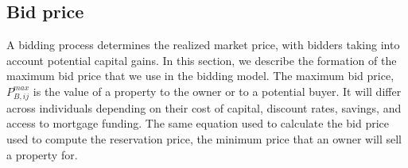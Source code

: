 {%






\subsection{Bid price}\label{sec:bid-price}
A bidding process determines the realized market price, with bidders taking into account potential capital gains. In this section, we describe the formation of the maximum bid price that we use in the bidding model. The maximum \gls{bid price}, $P_{B,ij}^{max}$ %
is the value of a property to the owner or to a potential buyer. It will differ across individuals depending on their cost of capital, discount rates,  savings, and access to mortgage funding. The same equation used to calculate the bid price used to compute the \gls{reservation price}, the minimum price that an owner will sell a property for. 

}
